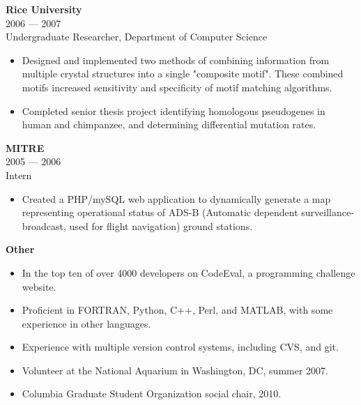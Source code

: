 \textbf{Rice University}\\
2006 --- 2007\\
Undergraduate Researcher, Department of Computer Science\\ 
\begin{itemize}[topsep=1ex, partopsep=0ex, parsep=0ex, itemsep=0.5ex]
    \item Designed and implemented two methods of combining information from multiple crystal structures into a single "composite motif". These combined motifs increased sensitivity and specificity of motif matching algorithms.
    \item Completed senior thesis project identifying homologous pseudogenes in human and chimpanzee, and determining differential mutation rates.
\end{itemize}

\vspace{\mybigskip}
\textbf{MITRE}\\
2005 --- 2006\\
Intern\\
\begin{itemize}[topsep=1ex, partopsep=0ex, parsep=0ex, itemsep=0.5ex]
    \item Created a PHP/mySQL web application to dynamically generate a map representing operational status of ADS-B (Automatic dependent surveillance-broadcast, used for flight navigation) ground stations.
\end{itemize}

\vspace{\mybigskip}
\myfontsize{\littleheader}
\textbf{Other}\\
\myfontsize{\bodysize}
\begin{itemize}[topsep=1ex, partopsep=0ex, parsep=0ex, itemsep=0.5ex]
    \item In the top ten of over 4000 developers on CodeEval, a programming challenge website.\\
    \item Proficient in FORTRAN, Python, C++, Perl, and MATLAB, with some experience in other languages.\\
    \item Experience with multiple version control systems, including CVS, and git.\\
    \item Volunteer at the National Aquarium in Washington, DC, summer 2007.\\
    \item Columbia Graduate Student Organization social chair, 2010.
\end{itemize}

